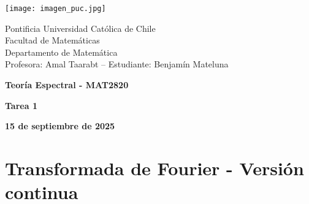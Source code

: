 \documentclass{article}
\begin{document}
\begin{minipage}{2.5cm}
    \texttt{[image: imagen\_puc.jpg]}
\end{minipage}
\begin{minipage}{14cm}
    {\sc Pontificia Universidad Católica de Chile\\
    Facultad de Matemáticas\\
    Departamento de Matemática\\
    Profesora: Amal Taarabt -- Estudiante: Benjamín Mateluna}
\end{minipage}
\vspace{1ex}

{\centerline{\bf Teoría Espectral - MAT2820}
\centerline{\bf Tarea 1}}
\centerline{\bf 15 de septiembre de 2025}

\section{Transformada de Fourier - Versión continua}
\end{document}
